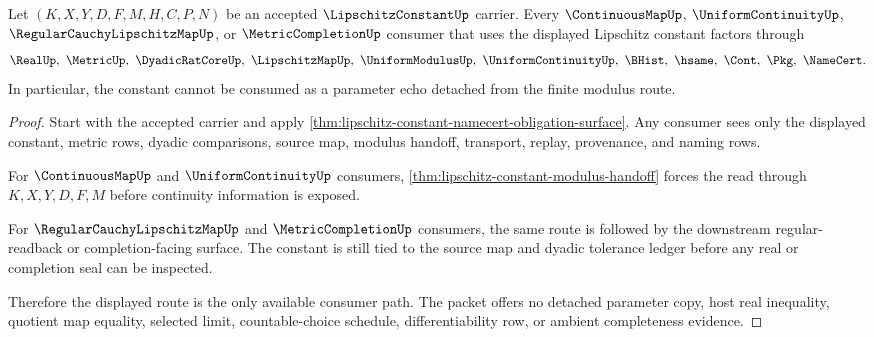 \begin{theorem}\label{thm:lipschitz-constant-uniform-continuity-route}
Let $(K,X,Y,D,F,M,H,C,P,N)$ be an accepted $\LipschitzConstantUp$ carrier. Every $\ContinuousMapUp$, $\UniformContinuityUp$, $\RegularCauchyLipschitzMapUp$, or $\MetricCompletionUp$ consumer that uses the displayed Lipschitz constant factors through
$$
\RealUp,\ \MetricUp,\ \DyadicRatCoreUp,\ \LipschitzMapUp,\ \UniformModulusUp,\ \UniformContinuityUp,\ \BHist,\ \hsame,\ \Cont,\ \Pkg,\ \NameCert .
$$
In particular, the constant cannot be consumed as a parameter echo detached from the finite modulus route.
\end{theorem}
\begin{proof}
Start with the accepted carrier and apply \autoref{thm:lipschitz-constant-namecert-obligation-surface}. Any consumer sees only the displayed constant, metric rows, dyadic comparisons, source map, modulus handoff, transport, replay, provenance, and naming rows.

For $\ContinuousMapUp$ and $\UniformContinuityUp$ consumers, \autoref{thm:lipschitz-constant-modulus-handoff} forces the read through $K,X,Y,D,F,M$ before continuity information is exposed.

For $\RegularCauchyLipschitzMapUp$ and $\MetricCompletionUp$ consumers, the same route is followed by the downstream regular-readback or completion-facing surface. The constant is still tied to the source map and dyadic tolerance ledger before any real or completion seal can be inspected.

Therefore the displayed route is the only available consumer path. The packet offers no detached parameter copy, host real inequality, quotient map equality, selected limit, countable-choice schedule, differentiability row, or ambient completeness evidence.
\end{proof}

